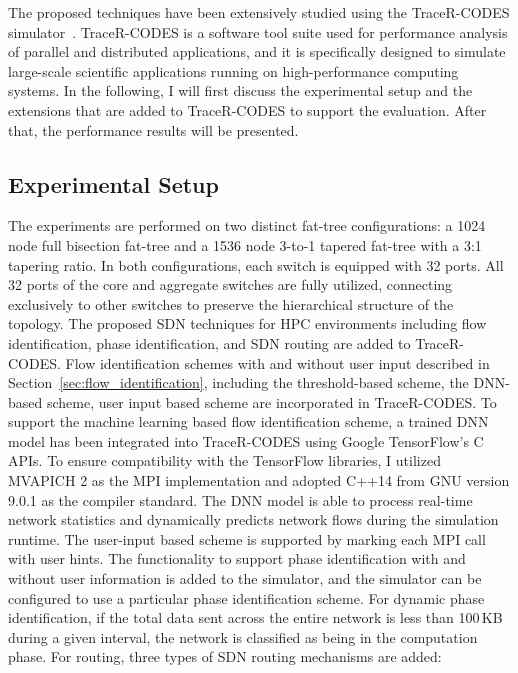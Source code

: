 The proposed techniques have been extensively studied using
the TraceR-CODES simulator~\cite{jain2016evaluating,mubarak2016enabling}.
TraceR-CODES is a software tool suite used for
performance analysis of parallel and distributed applications, and it
is specifically designed to simulate large-scale scientific applications
running on high-performance computing systems. In the following, I will first
discuss the experimental setup and the extensions that are added to
TraceR-CODES to support the evaluation. After that, the performance results
will be presented.

\subsection{Experimental Setup}

The experiments are performed on two distinct fat-tree configurations:
a 1024 node full bisection fat-tree and a 1536 node 3-to-1 tapered fat-tree
with a 3:1 tapering ratio. In both configurations, each switch
is equipped with 32 ports. All 32 ports of the core and aggregate switches are
fully utilized, connecting exclusively to other switches to preserve the
hierarchical structure of the topology.
The proposed SDN techniques for HPC environments including flow
identification, phase identification, and SDN routing are added to
TraceR-CODES. Flow identification schemes with and without user input
described in Section~\ref{sec:flow_identification}, including the
threshold-based scheme, the DNN-based scheme, user input based scheme
are incorporated in TraceR-CODES. 
To support the machine learning based flow identification scheme,
a trained DNN model has been integrated
into TraceR-CODES using Google TensorFlow's C APIs. To ensure
compatibility with the TensorFlow libraries, I utilized
MVAPICH 2 as the MPI implementation and adopted C++14 from GNU
version 9.0.1 as the compiler standard. The DNN model is able to 
process real-time network statistics and  
dynamically predicts network flows during the simulation runtime.
The user-input based scheme is supported by marking each MPI call with
user hints. 
The functionality to support phase identification with and without user information is added to the simulator, and the simulator can be configured to use a particular phase identification scheme. For dynamic phase identification, if the total data sent across the entire network is less than 100\,KB during a given interval, the network is classified as being in the computation phase. For routing, 
three types of SDN routing mechanisms are added: 
